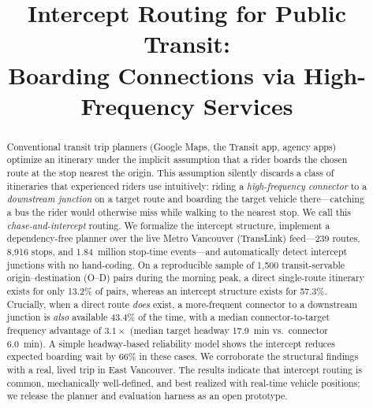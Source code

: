 \documentclass[conference]{IEEEtran}
\begin{document}
\title{Intercept Routing for Public Transit:\\ Boarding Connections via High-Frequency Services}

\author{
}

\maketitle

\begin{abstract}
Conventional transit trip planners (Google Maps, the Transit app, agency apps)
optimize an itinerary under the implicit assumption that a rider boards the
chosen route at the stop nearest the origin. This assumption silently discards a
class of itineraries that experienced riders use intuitively: riding a
\emph{high-frequency connector} to a \emph{downstream junction} on a target
route and boarding the target vehicle there---catching a bus the rider would
otherwise miss while walking to the nearest stop. We call this
\emph{chase-and-intercept} routing. We formalize the intercept structure,
implement a dependency-free planner over the live Metro Vancouver (TransLink)
feed---239 routes, 8{,}916 stops, and 1.84~million stop-time events---and
automatically detect intercept junctions with no hand-coding. On a reproducible
sample of 1{,}500 transit-servable origin--destination (O--D) pairs during the
morning peak, a direct single-route itinerary exists for only 13.2\% of pairs,
whereas an intercept structure exists for 57.3\%. Crucially, when a direct
route \emph{does} exist, a more-frequent connector to a downstream junction is
\emph{also} available 43.4\% of the time, with a median connector-to-target
frequency advantage of $3.1\times$ (median target headway 17.9~min vs.\ connector
6.0~min). A simple headway-based reliability model shows the intercept reduces
expected boarding wait by 66\% in these cases. We corroborate the structural
findings with a real, lived trip in East Vancouver. The results indicate that
intercept routing is common, mechanically well-defined, and best realized with
real-time vehicle positions; we release the planner and evaluation harness as an
open prototype.
\end{abstract}
\end{document}
